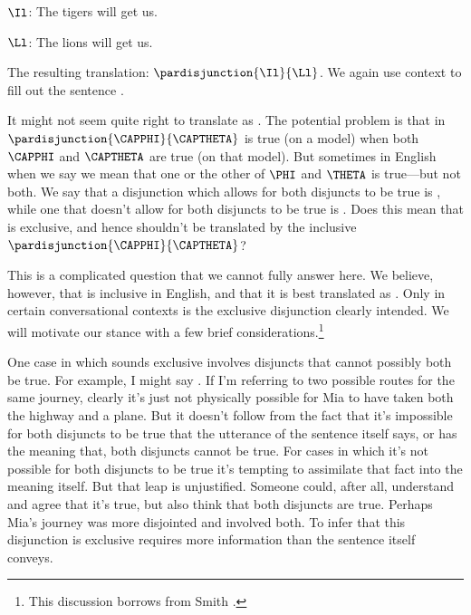 	\begin{description}[itemsep=0em]
		\item[Translation Key:] \hfill{} 
		\begin{description}[itemsep=0em]
			\item $\Il$: The tigers will get us.
			\item $\Ll$: The lions will get us.
		\end{description} 
	\end{description}

\noindent{}The resulting translation: $\pardisjunction{\Il}{\Ll}$.  We again use context to fill out the sentence .  

It might not seem quite right to translate  as \mention{$\VEE$}. 
 The potential problem is that in \GSL{} $\pardisjunction{\CAPPHI}{\CAPTHETA}$ is true (on a model) when both $\CAPPHI$ and $\CAPTHETA$ are true (on that model). 
 But sometimes in English when we say  we mean that one or the other of $\PHI$ and $\THETA$ is true---but not both. 
 We say that a disjunction which allows for both disjuncts to be true is , while one that doesn't allow for both disjuncts to be true is .
 Does this mean that  is exclusive, and hence shouldn't be translated by the inclusive $\pardisjunction{\CAPPHI}{\CAPTHETA}$? 
 
This is a complicated question that we cannot fully answer here. 
We believe, however, that  is inclusive in English, and that it is best translated as \mention{$\VEE$}.  Only in certain conversational contexts is the exclusive disjunction clearly intended.  We will motivate our stance with a few brief considerations.\footnote{This discussion borrows from Smith \citeyear[117--22]{Smith2012}.}
 	
One case in which  sounds exclusive involves disjuncts that cannot possibly both be true. 
 	For example, I might say . 
 	If I'm referring to two possible routes for the same journey, clearly it's just not physically possible for Mia to have taken both the highway and a plane. 
 	But it doesn't follow from the fact that it's impossible for both disjuncts to be true that the utterance of the sentence itself says, or has the meaning that, both disjuncts cannot be true. 
 	For cases in which it's not possible for both disjuncts to be true it's tempting to assimilate that fact into the meaning itself. 
 	But that leap is unjustified. 
 	Someone could, after all, understand  and agree that it's true, but also think that both disjuncts are true.  Perhaps Mia's journey was more disjointed and involved both.  To infer that this disjunction is exclusive requires more information than the sentence itself conveys.
 	
